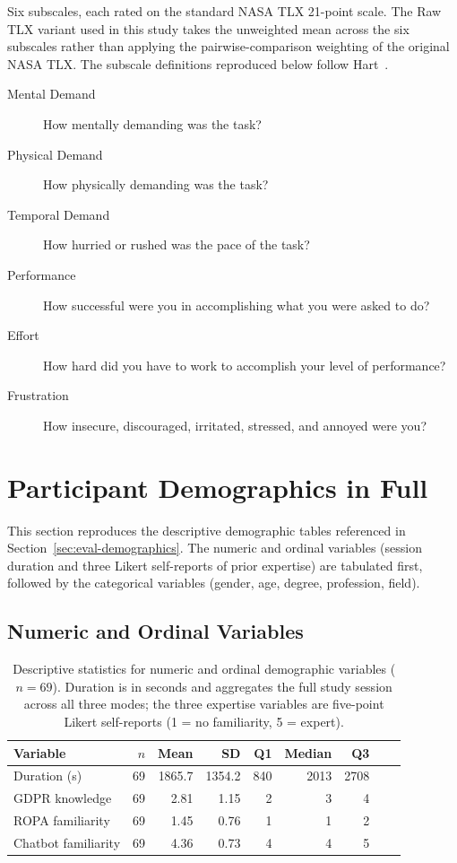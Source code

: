 Six subscales, each rated on the standard NASA TLX 21-point
scale. The Raw TLX variant used in this study takes the
unweighted mean across the six subscales rather than applying the
pairwise-comparison weighting of the original NASA TLX. The
subscale definitions reproduced below follow Hart~\cite{Hart2006}.

\begin{description}
    \item[Mental Demand] How mentally demanding was the task?
    \item[Physical Demand] How physically demanding was the task?
    \item[Temporal Demand] How hurried or rushed was the pace of the task?
    \item[Performance] How successful were you in accomplishing what you were asked to do?
    \item[Effort] How hard did you have to work to accomplish your level of performance?
    \item[Frustration] How insecure, discouraged, irritated, stressed, and annoyed were you?
\end{description}


\section{Participant Demographics in Full}
\label{app:demographics}

This section reproduces the descriptive demographic tables
referenced in Section~\ref{sec:eval-demographics}. The numeric and
ordinal variables (session duration and three Likert self-reports
of prior expertise) are tabulated first, followed by the
categorical variables (gender, age, degree, profession, field).

\subsection{Numeric and Ordinal Variables}
\label{app:demographics-numeric}

\begin{table}[H]
\centering
\small
\begin{tabular}{@{}l r r r r r r r r@{}}
\toprule
Variable & $n$ & Mean & SD & Q1 & Median & Q3 \\
\midrule
Duration (s)         & 69 & 1865.7 & 1354.2 & 840 & 2013 & 2708 \\
GDPR knowledge       & 69 & 2.81  & 1.15  & 2   & 3    & 4 \\
ROPA familiarity     & 69 & 1.45  & 0.76  & 1   & 1    & 2 \\
Chatbot familiarity  & 69 & 4.36  & 0.73  & 4   & 4    & 5 \\
\bottomrule
\end{tabular}
\caption{Descriptive statistics for numeric and ordinal demographic
variables ($n = 69$). Duration is in seconds and aggregates the full
study session across all three modes; the three expertise variables
are five-point Likert self-reports (1 = no familiarity, 5 = expert).}
\label{tab:demographics-numeric}
\end{table}

